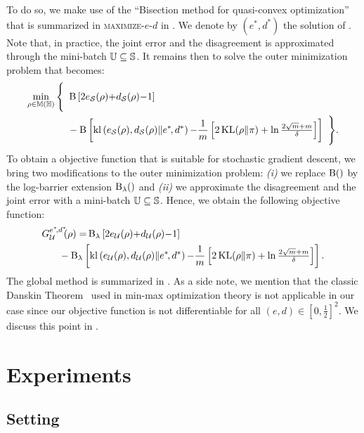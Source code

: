 To do so, we make use of the ``Bisection method for quasi-convex optimization''~\citep{BoydVandenberghe2014} that is summarized in  \textsc{maximize-$e$-$d$} in .
We denote by $(e^{*\!}, d^*)$ the solution of .
Note that, in practice, the joint error and the disagreement is approximated through the mini-batch $\mathbb{U}\subseteq\mathbb{S}$.
It remains then to solve the outer minimization problem that becomes:
\begin{align*}
    \min_{\rho\in\mathbb{M}(\mathbb{H})}\Bigg\{\ &\operatorname{B}\left[ 2e_{\mathcal{S}}(\rho){+}d_{\mathcal{S}}(\rho){-}1\right]\\
    &-\operatorname{B}\left[\operatorname{kl}\left( e_{\mathcal{S}}(\rho),  d_{\mathcal{S}}(\rho)\|e^{*\!}, d^*\right){-}\frac{1}{m}\left[ 2\operatorname{KL}(\rho\|\pi) + \ln\tfrac{2\sqrt{m}+m}{\delta}\right]\right]\ \Bigg\}.
\end{align*}
To obtain a objective function that is suitable for stochastic gradient descent, we bring two modifications to the outer minimization problem: {\it (i)} we replace $\operatorname{B}()$ by the log-barrier extension $\operatorname{B}_\lambda()$ and {\it (ii)} we approximate the disagreement and the joint error with a mini-batch $\mathbb{U}\subseteq\mathbb{S}$.
Hence, we obtain the following objective function: 
\begin{align*}
   \LObjbatch = & \logbar_{\lambda}\LB 2e_{\dbatch}(\Q){+}d_{\dbatch}(\Q){-}1\RB
   \\
    &\hspace{-1cm}-\logbar_\lambda \LB\kl\LP e_{\dbatch}(\Q),d_{\dbatch}(\Q)\|e^{*\!},d^*\RP{-}\frac{1}{\m}\LB 2\KL(\Q\|\P) + \ln\tfrac{2\sqrt{\m}+\m}{\delta}\RB\RB.
\end{align*}
The global method is summarized in .
\noindent As a side note, we  mention that the classic Danskin Theorem~\citep{Danskin1966} used in min-max optimization theory is not applicable in our case since our objective function is not differentiable for all $(e, d)\in[0, \tfrac{1}{2}]^2$. 
We discuss this point in .

\section{Experiments}
\label{chap:mv:sec:expe}

\subsection{Setting}

